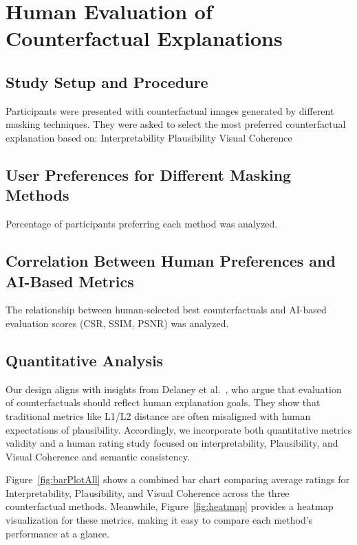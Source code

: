 \section{Human Evaluation of Counterfactual Explanations} \label{section:Human Evaluation of Counterfactual Explanations}

\subsection{Study Setup and Procedure}
Participants were presented with counterfactual images generated by different masking techniques.
They were asked to select the most preferred counterfactual explanation based on:
Interpretability
Plausibility
Visual Coherence

\subsection{User Preferences for Different Masking Methods}
Percentage of participants preferring each method was analyzed.


\subsection{Correlation Between Human Preferences and AI-Based Metrics}
The relationship between human-selected best counterfactuals and AI-based evaluation scores (CSR, SSIM, PSNR) was analyzed.




\subsection{Quantitative Analysis}
\label{subsec:quantitative_analysis}

Our design aligns with insights from Delaney et al.~\cite{DELANEY2023103995}, who argue that evaluation of counterfactuals should reflect human explanation goals. They show that traditional metrics like L1/L2 distance are often misaligned with human expectations of plausibility. Accordingly, we incorporate both quantitative metrics validity and a human rating study focused on interpretability, Plausibility, and Visual Coherence and semantic consistency.

Figure~\ref{fig:barPlotAll} shows a combined bar chart comparing average ratings for Interpretability, Plausibility, and Visual Coherence 
across the three counterfactual methods. Meanwhile, Figure~\ref{fig:heatmap} provides a heatmap visualization for these metrics, 
making it easy to compare each method's performance at a glance.

